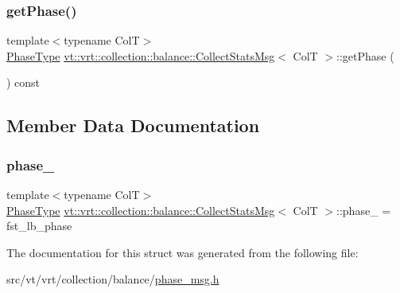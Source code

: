 \subsubsection{\texorpdfstring{get\+Phase()}{getPhase()}}
{\footnotesize\ttfamily template$<$typename ColT$>$ \\
\hyperlink{namespacevt_a46ce6733d5cdbd735d561b7b4029f6d7}{Phase\+Type} \hyperlink{structvt_1_1vrt_1_1collection_1_1balance_1_1_collect_stats_msg}{vt\+::vrt\+::collection\+::balance\+::\+Collect\+Stats\+Msg}$<$ ColT $>$\+::get\+Phase (\begin{DoxyParamCaption}{ }\end{DoxyParamCaption}) const\hspace{0.3cm}{\ttfamily [inline]}}



\subsection{Member Data Documentation}
\mbox{\label{structvt_1_1vrt_1_1collection_1_1balance_1_1_collect_stats_msg_a968baac6bc7d2bc23d48053c887d194a}} 
\subsubsection{\texorpdfstring{phase\+\_\+}{phase\_}}
{\footnotesize\ttfamily template$<$typename ColT$>$ \\
\hyperlink{namespacevt_a46ce6733d5cdbd735d561b7b4029f6d7}{Phase\+Type} \hyperlink{structvt_1_1vrt_1_1collection_1_1balance_1_1_collect_stats_msg}{vt\+::vrt\+::collection\+::balance\+::\+Collect\+Stats\+Msg}$<$ ColT $>$\+::phase\+\_\+ = fst\+\_\+lb\+\_\+phase\hspace{0.3cm}{\ttfamily [private]}}



The documentation for this struct was generated from the following file\+:\begin{DoxyCompactItemize}
\item 
src/vt/vrt/collection/balance/\hyperlink{phase__msg_8h}{phase\+\_\+msg.\+h}\end{DoxyCompactItemize}
